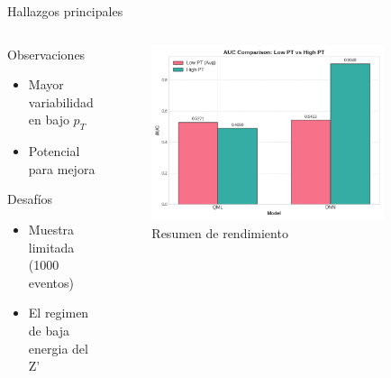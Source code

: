 \documentclass[aspectratio=43]{beamer}
\begin{document}
\begin{frame}{Hallazgos principales}
  \begin{columns}
    \begin{column}{0.43\textwidth}
      \begin{block}{Observaciones}
        \begin{itemize}
          \item Mayor variabilidad en bajo \texorpdfstring{$p_T$}{pT}
          \item Potencial para mejora
        \end{itemize}
      \end{block}
      \vspace{-0.3em}
      \begin{alertblock}{Desafíos}
        \begin{itemize}
          \item Muestra limitada (1000 eventos)
          \item El regimen de baja energia del Z'
        \end{itemize}
      \end{alertblock}
    \end{column}
    \begin{column}{0.55\textwidth}
      \vspace{-0.3em}
      \begin{figure}
        \includegraphics[width=0.85\textwidth]{resumen_hmmm/auc_low_vs_high_pt.png}
        \caption{\footnotesize Resumen de rendimiento}
      \end{figure}
    \end{column}
  \end{columns}
\end{frame}
\end{document}
